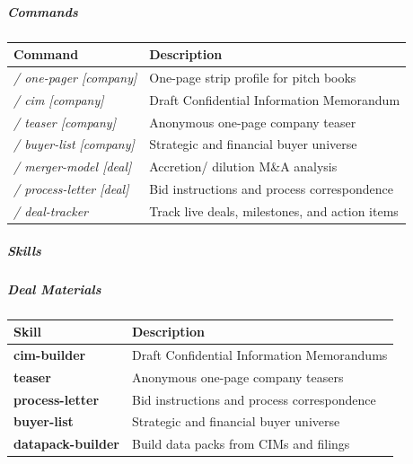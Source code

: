 \documentclass[11pt]{article}
\begin{document}
\subparagraph{Commands}\mbox{}\par

\begingroup
\small
\setlength{\tabcolsep}{2pt}
\begin{longtable}{>{\RaggedRight\arraybackslash\hspace{0pt}}p{}>{\RaggedRight\arraybackslash\hspace{0pt}}p{}}
\toprule
{} \textbf{Command} & \textbf{Description} \\
\midrule
{} \emph{/ one-pager [company]} & One-page strip profile for pitch books \\
{} \emph{/ cim [company]} & Draft Confidential Information Memorandum \\
{} \emph{/ teaser [company]} & Anonymous one-page company teaser \\
{} \emph{/ buyer-list [company]} & Strategic and financial buyer universe \\
{} \emph{/ merger-model [deal]} & Accretion/ dilution M\&A analysis \\
{} \emph{/ process-letter [deal]} & Bid instructions and process correspondence \\
{} \emph{/ deal-tracker} & Track live deals, milestones, and action items \\
\bottomrule
\end{longtable}
\endgroup

\subparagraph{Skills}\mbox{}\par

\subparagraph{Deal Materials}\mbox{}\par
\begingroup
\small
\setlength{\tabcolsep}{2pt}
\begin{longtable}{>{\RaggedRight\arraybackslash\hspace{0pt}}p{}>{\RaggedRight\arraybackslash\hspace{0pt}}p{}}
\toprule
{} \textbf{Skill} & \textbf{Description} \\
\midrule
{} \textbf{cim-builder} & Draft Confidential Information Memorandums \\
{} \textbf{teaser} & Anonymous one-page company teasers \\
{} \textbf{process-letter} & Bid instructions and process correspondence \\
{} \textbf{buyer-list} & Strategic and financial buyer universe \\
{} \textbf{datapack-builder} & Build data packs from CIMs and filings \\
\bottomrule
\end{longtable}
\endgroup
\end{document}
